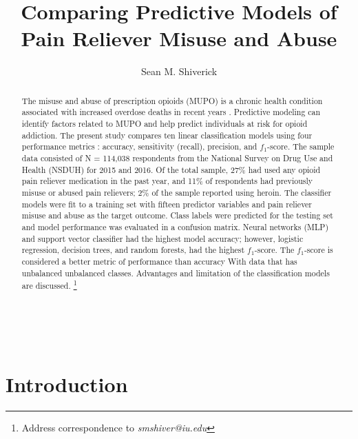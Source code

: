 \\\documentclass[sigconf]{acmart}
\begin{document}
  \title{Comparing Predictive Models of Pain Reliever Misuse and Abuse}
  \author{Sean M. Shiverick}
\renewcommand{\shortauthors}{S.M. Shiverick}


\begin{abstract}

The misuse and abuse of prescription opioids (MUPO) is a chronic health 
condition associated with increased overdose deaths in recent years 
\cite{nida18}. Predictive modeling can identify factors related to MUPO and 
help predict individuals at risk for opioid addiction. The present study 
compares ten linear classification models using four performance metrics 
: accuracy, sensitivity (recall), precision, and $f_1$-score. The sample 
data consisted of N = 114,038 respondents from the National Survey on Drug 
Use and Health (NSDUH) for 2015 and 2016. Of the total sample, 27\% had 
used any opioid pain reliever medication in the past year, and 11\% of 
respondents had previously misuse or abused pain relievers; 2\% of the 
sample reported using heroin. The classifier models were fit to a training 
set with fifteen predictor variables and pain reliever misuse and abuse as 
the target outcome. Class labels were predicted for the testing set and model 
performance was evaluated in a confusion matrix. Neural networks (MLP) and 
support vector classifier had the highest model accuracy; however, logistic
regression, decision trees, and random forests, had the highest $f_1$-score. 
The $f_1$-score is considered a better metric of performance than accuracy 
With data that has unbalanced unbalanced classes. Advantages and limitation 
of the classification models are discussed. 
\footnote{ Address correspondence to \textit{smshiver@iu.edu}}

\end{abstract}
\maketitle

\section{Introduction}
\end{document}

